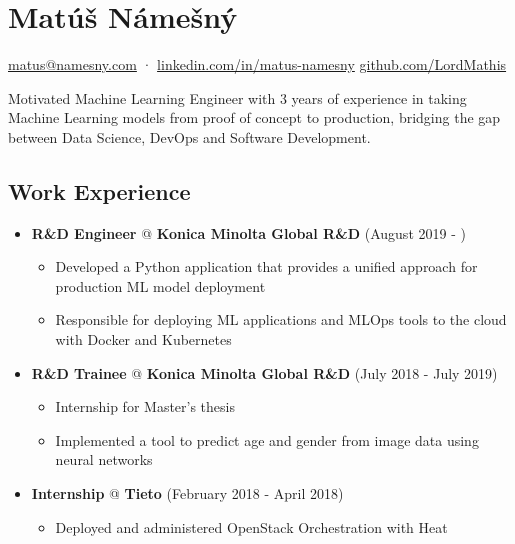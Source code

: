 \documentclass[a4,12pt]{article}
\begin{document}
\section*{Matúš Námešný}

\begin{center}
\href{mailto:matus@namesny.com}{matus@namesny.com} · 
\href{https://www.linkedin.com/in/matus-namesny/}{linkedin.com/in/matus-namesny}
\href{https://www.github.com/LordMathis}{github.com/LordMathis}
\end{center}

 Motivated Machine Learning Engineer with 3 years of experience in taking Machine Learning models from proof of concept to production, bridging the gap between Data Science, DevOps and Software Development.


\subsection*{Work Experience}\label{work}

\begin{itemize}
\item
  \textbf{R\&D Engineer} @ \textbf{Konica Minolta Global R\&D} \hfill (August 2019 - )
  \begin{itemize}
      \item Developed a Python application that provides a unified approach for production ML model deployment
      \item Responsible for deploying ML applications and MLOps tools to the cloud with Docker and Kubernetes
  \end{itemize}
\item
  \textbf{R\&D Trainee} @ \textbf{Konica Minolta Global R\&D} \hfill (July 2018 - July 2019)
  \begin{itemize}
      \item Internship for Master's thesis
      \item Implemented a tool to predict age and gender from image data using neural networks
  \end{itemize}
\item
  \textbf{Internship} @ \textbf{Tieto} \hfill (February 2018 - April 2018)
  \begin{itemize}
      \item Deployed and administered OpenStack Orchestration with Heat
  \end{itemize}
\end{itemize}
\end{document}
